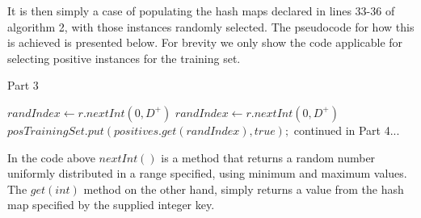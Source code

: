 \documentclass[twoside,a4paper]{refart}
\begin{document}
It is then simply a case of populating the hash maps declared in lines 33-36 of algorithm 2, with those instances randomly selected. The pseudocode for how this is achieved is presented below. For brevity we only show the code applicable for selecting positive instances for the training set.
\begin{algorithm}[!h]
\small
\caption{Part 3}
\begin{algorithmic}[1]
	\State $randIndex \leftarrow r.nextInt(0,D^{+})$
					\State $randIndex \leftarrow r.nextInt(0,D^{+})$
				\EndWhile
			\EndIf
			\State $posTrainingSet.put(positives.get(randIndex), true);$
\EndWhile
\State \Comment continued in Part 4...
\end{algorithmic}
\end{algorithm}

In the code above $nextInt()$ is a method that returns a random number uniformly distributed in a range specified, using minimum and maximum values. The $get(int)$ method on the other hand, simply returns a value from the hash map specified by the supplied integer key.
\end{document}
